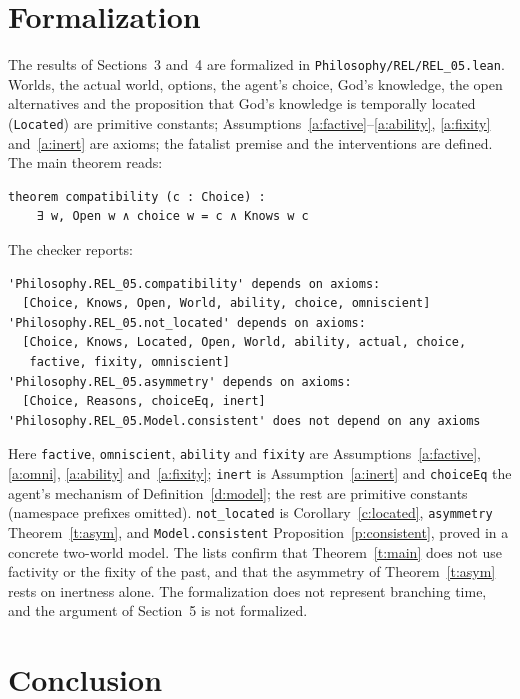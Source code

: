 \documentclass{situationist-preprint}
\begin{document}
\section{Formalization}

The results of Sections~3 and~4 are formalized in \nolinkurl{Philosophy/REL/REL_05.lean}. Worlds, the actual world, options, the agent's choice, God's knowledge, the open alternatives and the proposition that God's knowledge is temporally located (\texttt{Located}) are primitive constants; Assumptions~\ref{a:factive}--\ref{a:ability}, \ref{a:fixity} and~\ref{a:inert} are axioms; the fatalist premise and the interventions are defined. The main theorem reads:

\begin{lstlisting}
theorem compatibility (c : Choice) :
    ∃ w, Open w ∧ choice w = c ∧ Knows w c
\end{lstlisting}

\noindent The checker reports:

\begin{lstlisting}
'Philosophy.REL_05.compatibility' depends on axioms:
  [Choice, Knows, Open, World, ability, choice, omniscient]
'Philosophy.REL_05.not_located' depends on axioms:
  [Choice, Knows, Located, Open, World, ability, actual, choice,
   factive, fixity, omniscient]
'Philosophy.REL_05.asymmetry' depends on axioms:
  [Choice, Reasons, choiceEq, inert]
'Philosophy.REL_05.Model.consistent' does not depend on any axioms
\end{lstlisting}

\noindent Here \texttt{factive}, \texttt{omniscient}, \texttt{ability} and \texttt{fixity} are Assumptions~\ref{a:factive}, \ref{a:omni}, \ref{a:ability} and~\ref{a:fixity}; \texttt{inert} is Assumption~\ref{a:inert} and \texttt{choiceEq} the agent's mechanism of Definition~\ref{d:model}; the rest are primitive constants (namespace prefixes omitted). \texttt{not\_located} is Corollary~\ref{c:located}, \texttt{asymmetry} Theorem~\ref{t:asym}, and \texttt{Model.consistent} Proposition~\ref{p:consistent}, proved in a concrete two-world model. The lists confirm that Theorem~\ref{t:main} does not use factivity or the fixity of the past, and that the asymmetry of Theorem~\ref{t:asym} rests on inertness alone. The formalization does not represent branching time, and the argument of Section~5 is not formalized.

\section{Conclusion}
\end{document}
